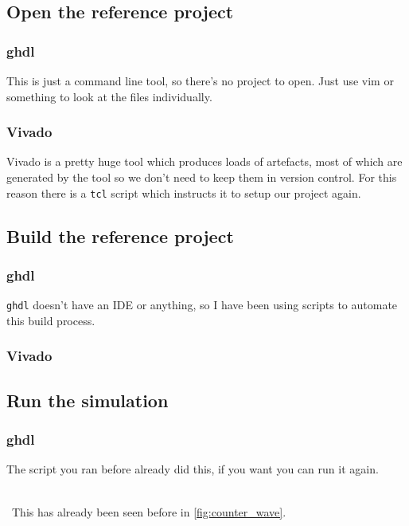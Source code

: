 \subsection{Open the reference project}
\subsubsection{ghdl}
This is just a command line tool, so there's no project to open. Just use vim or something to look at the files individually.

\subsubsection{Vivado}
Vivado is a pretty huge tool which produces loads of artefacts, most of which are generated by the tool so we don't need to keep them in version control. For this reason there is a \texttt{tcl} script which instructs it to setup our project again.


\subsection{Build the reference project}
\subsubsection{ghdl}
\texttt{ghdl} doesn't have an IDE or anything, so I have been using scripts to automate this build process. 


\subsubsection{Vivado}

\subsection{Run the simulation}
\subsubsection{ghdl} 
The script you ran before already did this, if you want you can run it again.



\\
\,
This has already been seen before in \cref{fig:counter_wave}.

